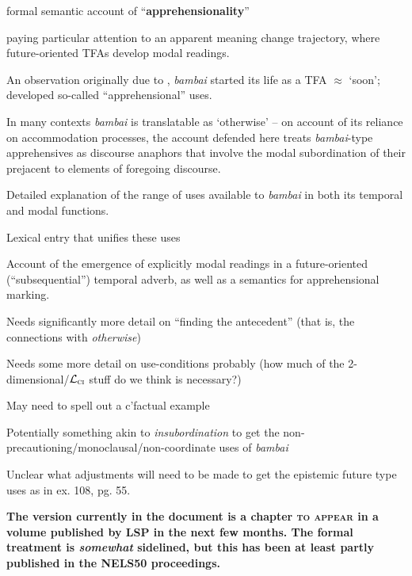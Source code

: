 \documentclass[11pt,dvipsnames]{article}
\begin{document}
\begin{description}
	\begin{itemize}
\item formal semantic account of ``\textbf{apprehensionality}''
\item paying particular attention to an apparent meaning change trajectory, where future-oriented TFAs develop modal readings. 
\item  An observation originally due to \citet{Angelo2016,Angelo2018}, \textit{bambai} started its life as a TFA $ \approx $ `soon'; developed so-called ``apprehensional'' uses.
\item In many contexts \textit{bambai} is translatable as `otherwise' -- on account of its reliance on accommodation processes, the account defended here treats \textit{bambai}-type apprehensives as discourse anaphors that involve the modal subordination of their prejacent to elements of foregoing discourse.
\item Detailed explanation of the range of uses available to \textit{bambai} in both its temporal and modal functions.
\item Lexical entry that unifies these uses
\item Account of the emergence of explicitly modal readings in a future-oriented (``subsequential'') temporal adverb, as well as a semantics for apprehensional marking.%
{\color{violet}
	\item Needs significantly more detail on ``finding the antecedent'' (that is, the connections with \textit{otherwise})
	\item Needs some more detail on use-conditions probably (how much of the 2-dimensional/$ \mathcal L_{\textsc{ci}} $ stuff do we think is necessary?)
	\item May need to spell out a c'factual example
	\item Potentially something akin to \textit{insubordination} to get the non-precautioning/monoclausal/non-coordinate uses of \textit{bambai}
	\item Unclear what adjustments will need to be made to get the epistemic future type uses as in ex. 108, pg. 55.
	
}
\end{itemize}
\item[The \textit{NEC}] \textbf{The version currently in the document is a chapter \textsc{to appear} in a volume published by LSP in the next few months. The formal treatment is \textit{somewhat} sidelined, but this has been at least partly published in the NELS50 proceedings.}
	\begin{itemize}
		

\end{itemize}
\end{description}
\end{document}
